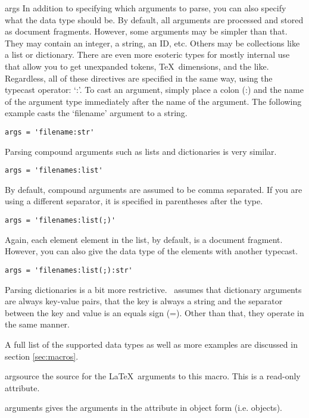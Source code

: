 \begin{memberdesc}[Macro]{args}
In addition to specifying which arguments to parse, you can also specify 
what the data type should be. 
By default, all arguments are processed and stored as document fragments.
However, some arguments may be simpler than that.  They may contain an integer,
a string, an ID, etc.  Others may be collections like a list or dictionary.
There are even more esoteric types for mostly internal use that allow you to
get unexpanded tokens, \TeX\ dimensions, and the like.  Regardless, all of 
these directives are specified in the same way, using the typecast operator:
`:'.  To cast an argument, simply place a colon (:) and the name of the 
argument type immediately after the name of the argument.  The following example
casts the `filename' argument to a string.
\begin{verbatim}
args = 'filename:str'
\end{verbatim}

Parsing compound arguments such as lists and dictionaries is very similar.
\begin{verbatim}
args = 'filenames:list'
\end{verbatim}
By default, compound arguments are assumed to be comma separated.  If you
are using a different separator, it is specified in parentheses after the type.
\begin{verbatim}
args = 'filenames:list(;)'
\end{verbatim}
Again, each element element in the list, by default, is a document fragment.
However, you can also give the data type of the elements with another typecast.
\begin{verbatim}
args = 'filenames:list(;):str'
\end{verbatim}

Parsing dictionaries is a bit more restrictive.  \plasTeX\ assumes that 
dictionary arguments are always key-value pairs, that the key is always
a string and the separator between the key and value is an equals sign (=).  
Other than that, they operate in the same manner.

A full list of the supported data types as well as more examples are
discussed in section \ref{sec:macros}.
\end{memberdesc}

\begin{memberdesc}[Macro]{argsource}
the source for the \LaTeX\ arguments to this macro.  This is a read-only 
attribute.
\end{memberdesc}

\begin{memberdesc}[Macro]{arguments}
gives the arguments in the  attribute in object form 
(i.e.  objects).
\end{memberdesc}

